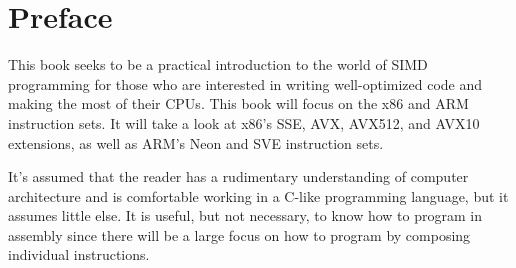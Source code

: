 \chapter*{Preface}
This book seeks to be a practical introduction to the world of SIMD programming for those who are
interested in writing well-optimized code and making the most of their CPUs. This book will focus on
the x86 and ARM instruction sets. It will take a look at x86's SSE, AVX, AVX512, and AVX10
extensions, as well as ARM's Neon and SVE instruction sets.

It's assumed that the reader has a rudimentary understanding of computer architecture and is
comfortable working in a C-like programming language, but it assumes little else. It is useful, but
not necessary, to know how to program in assembly since there will be a large focus on how to
program by composing individual instructions.
